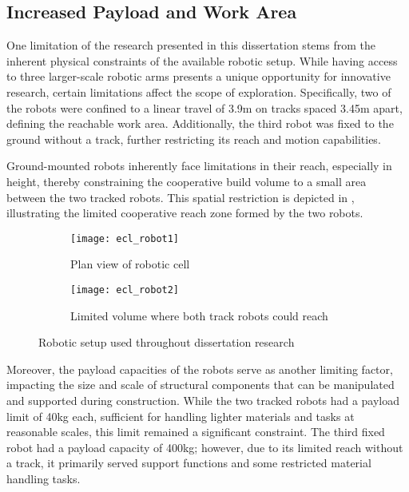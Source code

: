     \subsection{Increased Payload and Work Area}
        One limitation of the research presented in this dissertation stems from the inherent physical constraints of the available robotic setup. While having access to three larger-scale robotic arms presents a unique opportunity for innovative research, certain limitations affect the scope of exploration. Specifically, two of the robots were confined to a linear travel of 3.9m on tracks spaced 3.45m apart, defining the reachable work area. Additionally, the third robot was fixed to the ground without a track, further restricting its reach and motion capabilities.

        Ground-mounted robots inherently face limitations in their reach, especially in height, thereby constraining the cooperative build volume to a small area between the two tracked robots. This spatial restriction is depicted in , illustrating the limited cooperative reach zone formed by the two robots.

        \begin{figure}[h]
            \centering
            \begin{subfigure}{.49\textwidth}
                \centering
                \texttt{[image: ecl\_robot1]}
                \caption{Plan view of robotic cell}
            \end{subfigure}
            \begin{subfigure}{.49\textwidth}
                \centering
                \texttt{[image: ecl\_robot2]}
                \caption{Limited volume where both track robots could reach}
            \end{subfigure}
            \caption{Robotic setup used throughout dissertation research}
            \label{fig:ecl_setup}
        \end{figure}   

        \newpage
        Moreover, the payload capacities of the robots serve as another limiting factor, impacting the size and scale of structural components that can be manipulated and supported during construction. While the two tracked robots had a payload limit of 40kg each, sufficient for handling lighter materials and tasks at reasonable scales, this limit remained a significant constraint. The third fixed robot had a payload capacity of 400kg; however, due to its limited reach without a track, it primarily served support functions and some restricted material handling tasks.

